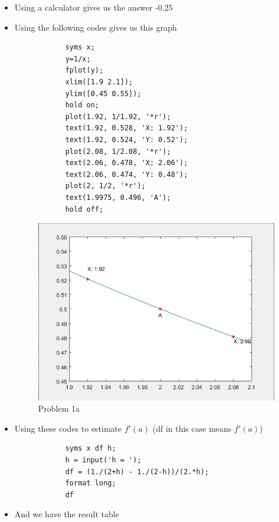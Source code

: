 \documentclass[12pt,en,a4paper]{article}
\begin{document}
	\begin{itemize}
		\item Using a calculator gives us the answer -0.25
		\item Using the following codes gives us this graph
		\begin{mdframed}[hidealllines=true,backgroundcolor=magenta!10]
			\begin{lstlisting}
			syms x;
			y=1/x;
			fplot(y);
			xlim([1.9 2.1]);
			ylim([0.45 0.55]);
			hold on;
			plot(1.92, 1/1.92, '*r');
			text(1.92, 0.528, 'X: 1.92');
			text(1.92, 0.524, 'Y: 0.52');
			plot(2.08, 1/2.08, '*r');
			text(2.06, 0.478, 'X: 2.06');
			text(2.06, 0.474, 'Y: 0.48');
			plot(2, 1/2, '*r');
			text(1.9975, 0.496, 'A');
			hold off;
			\end{lstlisting}
		\end{mdframed}
		\begin{figure}[!h]
			\centering
			\includegraphics[scale=0.5]{1a.png}
			\caption*{Problem 1a}
			\label{prob1a}
		\end{figure}
		\item Using these codes to estimate \(f'(a)\) (df in this case means \(f'(a)\))\\
		\begin{mdframed}[hidealllines=true,backgroundcolor=magenta!10]
			\begin{lstlisting}
			syms x df h;
			h = input('h = ');
			df = (1./(2+h) - 1./(2-h))/(2.*h);
			format long;
			df
			\end{lstlisting}
		\end{mdframed}
		\item And we have the result table

\end{itemize}
\end{document}
